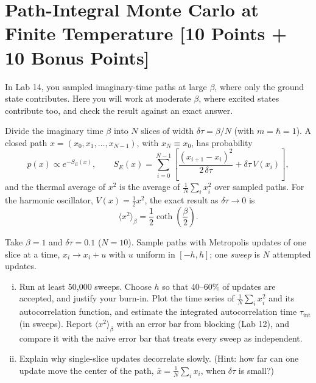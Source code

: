 \begin{solution}
\end{solution}

\newpage
\section{Path-Integral Monte Carlo at Finite Temperature [10 Points + 10 Bonus Points]}

In Lab 14, you sampled imaginary-time paths at large $\beta$, where only the ground state contributes.
Here you will work at moderate $\beta$, where excited states contribute too, and check the result against an exact answer.

Divide the imaginary time $\beta$ into $N$ slices of width $\delta\tau = \beta/N$ (with $m = \hbar = 1$).
A closed path $x = (x_0, x_1, \ldots, x_{N-1})$, with $x_N \equiv x_0$, has probability
\begin{equation}
  p(x) \propto e^{-S_E(x)}, \qquad
  S_E(x) = \sum_{i=0}^{N-1}\left[\frac{(x_{i+1}-x_i)^2}{2\,\delta\tau} + \delta\tau\, V(x_i)\right],
\end{equation}
and the thermal average of $x^2$ is the average of $\frac{1}{N}\sum_i x_i^2$ over sampled paths.
For the harmonic oscillator, $V(x) = \frac{1}{2}x^2$, the exact result as $\delta\tau \to 0$ is
\begin{equation}
  \langle x^2\rangle_\beta = \frac{1}{2}\coth\left(\frac{\beta}{2}\right).
\end{equation}

\begin{problem}[10]
  Take $\beta = 1$ and $\delta\tau = 0.1$ ($N = 10$).
  Sample paths with Metropolis updates of one slice at a time, $x_i \to x_i + u$ with $u$ uniform in $[-h, h]$; one \emph{sweep} is $N$ attempted updates.
  \begin{enumerate}[(i)]
    \item Run at least 50{,}000 sweeps.
          Choose $h$ so that 40--60\% of updates are accepted, and justify your burn-in.
          Plot the time series of $\frac{1}{N}\sum_i x_i^2$ and its autocorrelation function, and estimate the integrated autocorrelation time $\tau_\mathrm{int}$ (in sweeps).
          Report $\langle x^2\rangle_\beta$ with an error bar from blocking (Lab 12), and compare it with the naive error bar that treats every sweep as independent.
    \item Explain why single-slice updates decorrelate slowly.
          (Hint: how far can one update move the center of the path, $\bar x = \frac{1}{N}\sum_i x_i$, when $\delta\tau$ is small?)
  \end{enumerate}
\end{problem}

